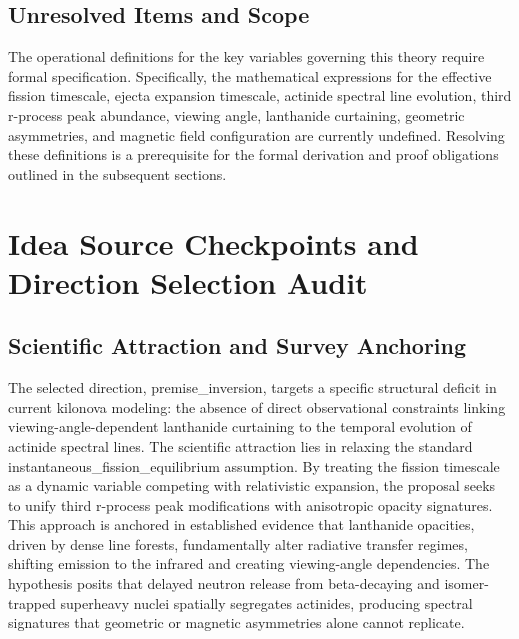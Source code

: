 \documentclass[conference]{IEEEtran}
\begin{document}
\subsection{Unresolved Items and Scope}
The operational definitions for the key variables governing this theory require formal specification. Specifically, the mathematical expressions for the effective fission timescale, ejecta expansion timescale, actinide spectral line evolution, third r-process peak abundance, viewing angle, lanthanide curtaining, geometric asymmetries, and magnetic field configuration are currently undefined. Resolving these definitions is a prerequisite for the formal derivation and proof obligations outlined in the subsequent sections.

\section{Idea Source Checkpoints and Direction Selection Audit}
\subsection{Scientific Attraction and Survey Anchoring}
The selected direction, premise\_inversion, targets a specific structural deficit in current kilonova modeling: the absence of direct observational constraints linking viewing-angle-dependent lanthanide curtaining to the temporal evolution of actinide spectral lines. The scientific attraction lies in relaxing the standard instantaneous\_fission\_equilibrium assumption. By treating the fission timescale as a dynamic variable competing with relativistic expansion, the proposal seeks to unify third r-process peak modifications with anisotropic opacity signatures. This approach is anchored in established evidence that lanthanide opacities, driven by dense line forests, fundamentally alter radiative transfer regimes, shifting emission to the infrared and creating viewing-angle dependencies. The hypothesis posits that delayed neutron release from beta-decaying and isomer-trapped superheavy nuclei spatially segregates actinides, producing spectral signatures that geometric or magnetic asymmetries alone cannot replicate.~\cite{cite_2bf3a687e25803e4,cite_2e146bff5b4a005e}
\end{document}
